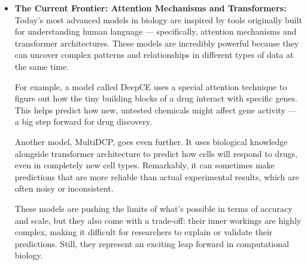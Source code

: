 \documentclass[twocolumn,12pt,a4paper]{article}
\begin{document}
\begin{itemize}
        \item \textbf{The Current Frontier: Attention Mechanisms and Transformers: }
        \\
         Today’s most advanced models in biology are inspired by tools originally built for understanding human language — specifically, attention mechanisms and transformer architectures. These models are incredibly powerful because they can uncover complex patterns and relationships in different types of data at the same time\cite{wu2022deep}.
    
        For example, a model called DeepCE uses a special attention technique to figure out how the tiny building blocks of a drug interact with specific genes. This helps predict how new, untested chemicals might affect gene activity — a big step forward for drug discovery\cite{pham2021deep}.
    
        Another model, MultiDCP, goes even further. It uses biological knowledge alongside transformer architecture to predict how cells will respond to drugs, even in completely new cell types. Remarkably, it can sometimes make predictions that are more reliable than actual experimental results, which are often noisy or inconsistent\cite{wu2022deep}.
    
        These models are pushing the limits of what’s possible in terms of accuracy and scale, but they also come with a trade-off: their inner workings are highly complex, making it difficult for researchers to explain or validate their predictions. Still, they represent an exciting leap forward in computational biology\cite{chow2022predicting}.
\end{itemize}
\end{document}
